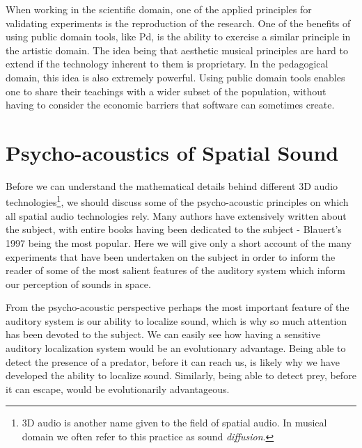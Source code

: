 When working in the scientific domain, one of the applied principles for validating experiments is the reproduction of the research. One of the benefits of using public domain tools, like Pd, is the ability to exercise a similar principle in the artistic domain. The idea being that aesthetic musical principles are hard to extend if the technology inherent to them is proprietary. In the pedagogical domain, this idea is also extremely powerful. Using public domain tools enables one to share their teachings with a wider subset of the population, without having to consider the economic barriers that software can sometimes create. 


\section{Psycho-acoustics of Spatial Sound}

Before we can understand the mathematical details behind different 3D audio technologies\footnote{3D audio is another name given to the field of spatial audio. In musical domain we often refer to this practice as sound \textit{diffusion}.}, we should discuss some of the psycho-acoustic principles on which all spatial audio technologies rely. Many authors have extensively written about the subject, with entire books having been dedicated to the subject - Blauert's 1997 \cite{blauert1997spatial} being the most popular. Here we will give only a short account of the many experiments that have been undertaken on the subject in order to inform the reader of some of the most salient features of the auditory system which inform our perception of sounds in space.

From the psycho-acoustic perspective perhaps the most important feature of the auditory system is our ability to localize sound, which is why so much attention has been devoted to the subject. We can easily see how having a sensitive auditory localization system would be an evolutionary advantage. Being able to detect the presence of a predator, before it can reach us, is likely why we have developed the ability to localize sound. Similarly, being able to detect prey, before it can escape, would be evolutionarily advantageous.

